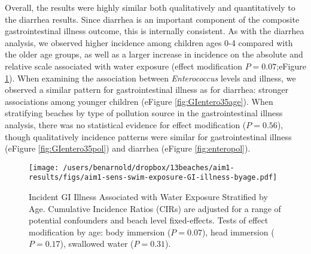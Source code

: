 \documentclass[12pt]{article}\usepackage[]{graphicx}\usepackage[]{color}
\begin{document}
Overall, the results were highly similar both qualitatively and quantitatively to the diarrhea results. Since diarrhea is an important component of the composite gastrointestinal illness outcome, this is internally consistent.  As with the diarrhea analysis, we observed higher incidence among children ages 0-4 compared with the older age groups, as well as a larger increase in incidence on the absolute and relative scale associated with water exposure (effect modification $P=0.07$;eFigure \ref{fig:GIswimex}).  When examining the association between \textit{Enterococcus} levels and illness, we observed a similar pattern for gastrointestinal illness as for diarrhea: stronger associations among younger children (eFigure \ref{fig:GIentero35age}). When stratifying beaches by type of pollution source in the gastrointestinal illness analysis, there was no statistical evidence for effect modification ($P=0.56$), though qualitatively incidence patterns were similar for gastrointestinal illness (eFigure \ref{fig:GIentero35pol}) and diarrhea (eFigure \ref{fig:enteropol}).

\begin{landscape}
\begin{figure}[htbp]
\begin{center}
\texttt{[image: /users/benarnold/dropbox/13beaches/aim1-results/figs/aim1-sens-swim-exposure-GI-illness-byage.pdf]}
\begin{minipage}{1.2\textwidth}
\caption{Incident GI Illness Associated with Water Exposure Stratified by Age. Cumulative Incidence Ratios (CIRs) are adjusted for a range of potential confounders and beach level fixed-effects. Tests of effect modification by age: body immersion ($P=0.07$), head immersion ($P=0.17$), swallowed water ($P=0.31$).}
\label{fig:GIswimex}
\end{minipage}
\end{center}
\end{figure}
\end{landscape}
\end{document}
